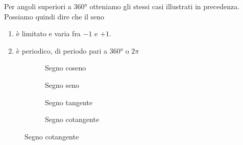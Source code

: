 Per angoli superiori a \ang{360} otteniamo gli stessi casi illustrati in precedenza. 
Possiamo quindi dire che il seno
\begin{enumerate}
	\item è limitato e varia fra $-1$ e $+1$.
	\item è periodico, di periodo pari a \ang{360} o $2\pi$
\end{enumerate} 
\begin{figure}
	\centering
	
	\label{fig:AndamentoSeno1}
\end{figure}%
\begin{figure}
	\centering
	
	\label{fig:AndamentoSeno2}
\end{figure}%
\begin{figure}
	\begin{subfigure}[b]{.5\linewidth}
		\centering
		\caption{Segno coseno}\label{fig:SegnoCoseno}
	\end{subfigure}%
	\begin{subfigure}[b]{.5\linewidth}
		\centering
		\caption{Segno seno}\label{fig:SegnoSeno}
	\end{subfigure}
	\begin{subfigure}[b]{.5\linewidth}
		\centering
		\caption{Segno tangente}\label{fig:SegnoTangente}
	\end{subfigure}%
	\begin{subfigure}[b]{.5\linewidth}
		\centering
		\caption{Segno cotangente}\label{fig:SegnoCotangente}
	\end{subfigure}
	\label{tab:segnofunzionigoniometriche}
\end{figure}
